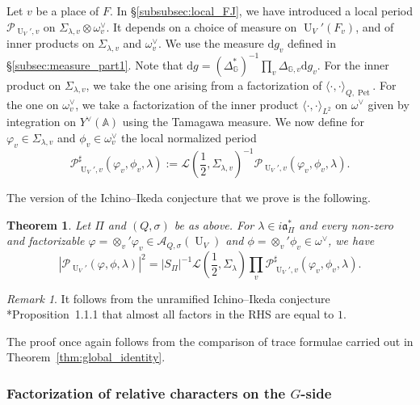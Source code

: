 \documentclass[letterpaper,11pt]{amsart}
\newcommand{\fa}{\mathfrak{a}}
\newcommand{\bA}{\mathbb{A}}
\newcommand{\bG}{\mathbb{G}}
\newcommand{\cA}{\mathcal{A}}
\newcommand{\cL}{\mathcal{L}}
\newcommand{\cP}{\mathcal{P}}
\newcommand{\rd}{\mathrm{d}}
\newcommand{\<}{\negthickspace}
\DeclareMathOperator{\U}{U}
\DeclareMathOperator{\Pet}{Pet}
\theoremstyle{definition}
\theoremstyle{plain}
\newtheorem{theorem}[definition]{Theorem}
\theoremstyle{remark}
\newtheorem{remark}[definition]{Remark}
\numberwithin{equation}{section}
\begin{document}
Let $v$ be a place of $F$. In \S\ref{subsubsec:local_FJ}, we have introduced a local period $\cP_{\U_V',v}$ on $\Sigma_{\lambda,v} \otimes \omega^\vee_{v}$. It depends on a choice of measure on $\U_V'(F_v)$, and of inner products on $\Sigma_{\lambda,v}$ and $\omega^\vee_{v}$. We use the measure $\rd g_v$ defined in \S\ref{subsec:measure_part1}. Note that $ \rd g = (\Delta_{\bG}^*)^{-1} \prod_v \Delta_{\bG,v} \rd g_v$. For the inner product on $\Sigma_{\lambda,v}$, we take the one arising from a factorization of $\langle\cdot,\cdot \rangle_{Q,\Pet}$. For the one on $\omega^\vee_v$, we take a factorization of the inner product $\langle \cdot,\cdot \rangle_{L^2}$ on $\omega^\vee$ given by integration on $Y^\vee(\bA)$ using the Tamagawa measure. We now define for $\varphi_v \in \Sigma_{\lambda,v}$ and $\phi_v \in \omega^\vee_{v}$ the local normalized period
\begin{equation*}
    \cP^\sharp_{\U_V',v}(\varphi_v,\phi_v,\lambda):=\cL(\frac{1}{2},\Sigma_{\lambda,v})^{-1}  \cP_{\U_V',v}(\varphi_v,\phi_v,\lambda).
\end{equation*}

The version of the Ichino--Ikeda conjecture that we prove is the following.

\begin{theorem}
    \label{thm:II_regular_intro}
    Let $\Pi$ and $(Q,\sigma)$ be as above. For $\lambda \in i \fa_\Pi^*$ and every non-zero and factorizable $\varphi =\otimes_v' \varphi_v \in \cA_{Q,\sigma}(\U_V)$ and $\phi=\otimes_v' \phi_v \in \omega^\vee$, we have
    \begin{equation}
    \label{eq:IY_regular_intro}
        |\cP_{\U_V'}(\varphi,\phi,\lambda)|^2=|S_\Pi|^{-1} \cL(\frac{1}{2},\Sigma_\lambda) \prod_v \cP^\sharp_{\U_V',v}(\varphi_v,\phi_v,\lambda).
    \end{equation}
\end{theorem}

\begin{remark}
    It follows from the unramified Ichino--Ikeda conjecture \cite{Xue2}*{Proposition~1.1.1} that almost all factors in the RHS are equal to $1$.
\end{remark}

The proof once again follows from the comparison of trace formulae carried out in Theorem~\ref{thm:global_identity}.

\subsubsection{Factorization of relative characters on the $G$-side}
\end{document}
